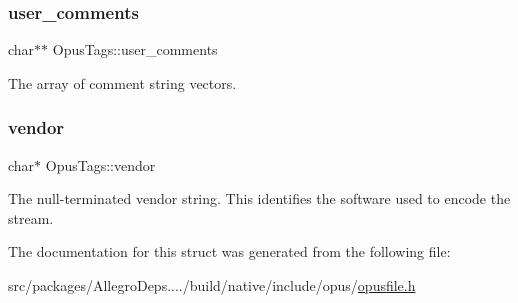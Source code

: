 \subsubsection{\texorpdfstring{user\+\_\+comments}{user\_comments}}
{\footnotesize\ttfamily char$\ast$$\ast$ Opus\+Tags\+::user\+\_\+comments}

The array of comment string vectors. \mbox{\label{struct_opus_tags_af6ff133dfd801934d981bc5905dae0bd}} 
\subsubsection{\texorpdfstring{vendor}{vendor}}
{\footnotesize\ttfamily char$\ast$ Opus\+Tags\+::vendor}

The null-\/terminated vendor string. This identifies the software used to encode the stream. 

The documentation for this struct was generated from the following file\+:\begin{DoxyCompactItemize}
\item 
src/packages/\+Allegro\+Deps..../build/native/include/opus/\hyperlink{opusfile_8h}{opusfile.\+h}\end{DoxyCompactItemize}

